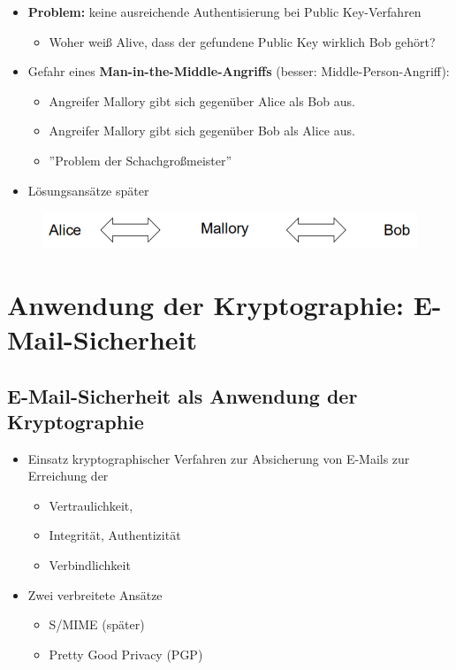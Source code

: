 \documentclass[openany]{book}
\begin{document}
\begin{itemize}
    \item \textbf{Problem:} keine ausreichende Authentisierung bei Public Key-Verfahren
    \begin{itemize}
        \item Woher weiß Alive, dass der gefundene Public Key wirklich Bob gehört?
    \end{itemize}
    \item Gefahr eines \textbf{Man-in-the-Middle-Angriffs} (besser: Middle-Person-Angriff):
    \begin{itemize}
        \item Angreifer Mallory gibt sich gegenüber Alice als Bob aus.
        \item Angreifer Mallory gibt sich gegenüber Bob als Alice aus.
        \item ''Problem der Schachgroßmeister''
    \end{itemize}
    \item Lösungsansätze später
\end{itemize}

\begin{figure}[h!]
    \centering
    \includegraphics[width=0.6\linewidth]{Pics/ManInTheMiddle.PNG}
\end{figure} 

\section{Anwendung der Kryptographie: E-Mail-Sicherheit}

\subsection{E-Mail-Sicherheit als Anwendung der Kryptographie}

\begin{itemize}
    \item Einsatz kryptographischer Verfahren zur Absicherung von E-Mails zur Erreichung der
    \begin{itemize}
        \item Vertraulichkeit,
        \item Integrität, Authentizität
        \item Verbindlichkeit
    \end{itemize}
    \item Zwei verbreitete Ansätze
    \begin{itemize}
        \item S/MIME (später)
        \item Pretty Good Privacy (PGP)
    \end{itemize}
\end{itemize}
\end{document}

